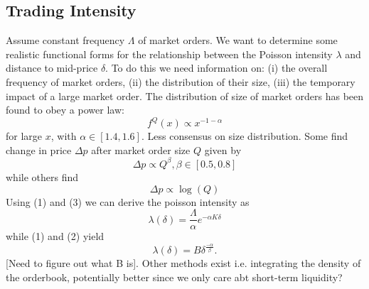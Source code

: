 \documentclass{article}
\begin{document}
\subsection{Trading Intensity}
Assume constant frequency $\Lambda$ of market orders. We want to determine some realistic functional forms for the relationship between the Poisson intensity $\lambda$ and distance to mid-price $\delta$. 
To do this we need information on: (i) the overall frequency of market orders, (ii) the distribution of their size, (iii) the temporary impact of a large market order. The distribution of size of market orders has been found to obey a power law:
\begin{equation}
    f^{Q}(x)\propto x^{-1-\alpha}
\end{equation}
for large $x$, with $\alpha\in[1.4,1.6].$
Less consensus on size distribution. Some find change in price $\Delta p$ after market order size $Q$ given by 
\begin{equation}
    \Delta p\propto Q^\beta, \beta\in[0.5,0.8]
\end{equation}
while others find
\begin{equation}
    \Delta p\propto\log(Q)
\end{equation}
Using (1) and (3) we can derive the poisson intensity as
$$\lambda(\delta)=\frac{\Lambda}{\alpha}e^{-\alpha K\delta}$$
while (1) and (2) yield
$$\lambda(\delta)=B\delta^{\frac{-\alpha}{\beta}}.$$
[Need to figure out what B is]. Other methods exist i.e. integrating the density of the orderbook, potentially better since we only care abt short-term liquidity?
\end{document}
